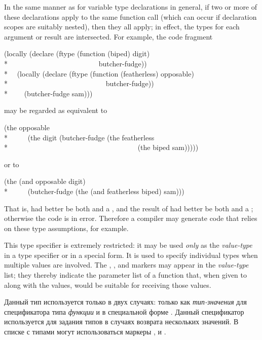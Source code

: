 \begin{flushdesc}
\begin{new}
In the same manner as for variable type declarations in general,
if two or more
of these declarations apply to the same function call (which can
occur if declaration scopes are suitably nested), then they all apply;
in effect, the types for each argument or result are intersected.
For example, the code fragment
\begin{lisp}
(locally (declare (ftype (function (biped) digit) \\*
~~~~~~~~~~~~~~~~~~~~~~~~~butcher-fudge)) \\*
~~(locally (declare (ftype (function (featherless) opposable) \\*
~~~~~~~~~~~~~~~~~~~~~~~~~~~butcher-fudge)) \\*
~~~~(butcher-fudge sam)))
\end{lisp}
may be regarded as equivalent to
\begin{lisp}
(the opposable \\*
~~~~~(the digit (butcher-fudge (the featherless \\*
~~~~~~~~~~~~~~~~~~~~~~~~~~~~~~~~~~~~(the biped sam)))))
\end{lisp}
or to
\begin{lisp}
(the (and opposable digit) \\*
~~~~~(butcher-fudge (the (and featherless biped) sam)))
\end{lisp}
That is,  had better be both  and a ,
and the result of  had better be both
 and a ; otherwise the code is in error.
Therefore a compiler may generate code that relies on these type assumptions,
for example.
\end{new}


\item[\cd{(values \emph{value1-type} \emph{value2-type} ...)}]
This type specifier is extremely restricted: it may be used \emph{only}
as the \emph{value-type} in a  type specifier or in
a  special form.  It is used to specify individual types when
multiple values are involved.
The
, , and  markers may appear in the \emph{value-type} list;
they thereby indicate the parameter list of a
function that, when given to  along with
the values, would be suitable for receiving those values.

\item[\cd{(values \emph{тип-значения-1} \emph{тип-значения-2} ...)}]
Данный тип используется только в двух случаях: только как \emph{тип-значения}
для спецификатора типа \emph{функции} и в специальной форме . Данный
спецификатор используется для задания типов в случаях возврата нескольких
значений.
В списке с типами могут использоваться маркеры ,  и .
\end{flushdesc}


